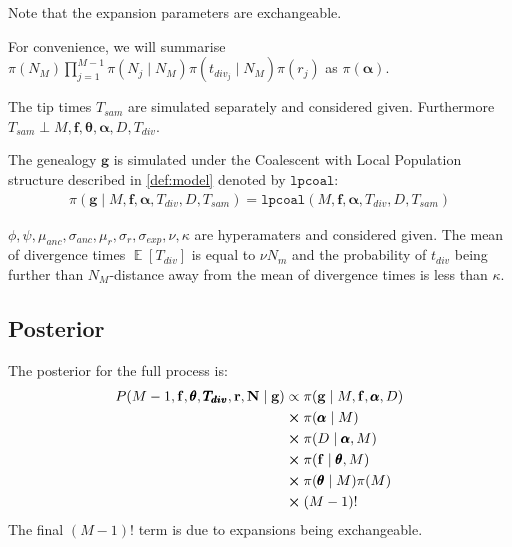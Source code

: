 \documentclass{report}
\theoremstyle{definition}
\begin{document}
Note that the expansion parameters are exchangeable.

For convenience, we will summarise $\pi(N_M)\prod\limits_{j=1}^{M-1}\pi(N_j\mid N_{M})\pi(t_{div_j}\mid N_{M})\pi(r_j)$ as $\pi(\pmb\alpha)$.

The tip times $T_{sam}$ are simulated separately and considered given. Furthermore $T_{sam} \perp M, \mathbf{f}, \pmb{\theta}, \pmb\alpha, D, T_{div}$.

The genealogy $\mathbf{g}$ is simulated under the Coalescent with Local Population structure described in \ref{def:model} denoted by $\texttt{lpcoal}$:
\begin{gather}
\pi(\mathbf{g}\mid M, \mathbf{f}, \pmb\alpha, T_{div}, D, T_{sam}) = \texttt{lpcoal}(M, \mathbf{f}, \pmb\alpha, T_{div}, D, T_{sam})
\end{gather} 

$\phi, \psi, \mu_{anc}, \sigma_{anc}, \mu_r, \sigma_r, \sigma_{exp}, \nu, \kappa$ are hyperamaters and considered given. The mean of divergence times $\mathop{\mathbb{E}}[T_{div}]$ is equal to $\nu N_m$ and the probability of $t_{div}$ being further than $N_M$-distance away from the mean of divergence times is less than $\kappa$.


\subsection{Posterior}
The posterior for the full process is:
\begin{gather}
\begin{aligned}
P(M-1, \mathbf{f}, \pmb{\theta}, \pmb{T_{div}}, \mathbf{r}, \mathbf{N}\mid\mathbf{g})
&\propto \pi(\mathbf{g}\mid M, \mathbf{f}, \pmb\alpha, D)\\
&\cross \pi(\pmb\alpha\mid M)\\
&\cross \pi(D\mid \pmb\alpha,M)\\
&\cross \pi(\mathbf{f}\mid\pmb{\theta}, M)\\
&\cross\pi(\pmb{\theta}\mid M)\pi(M)\\
&\cross (M-1)!
\end{aligned}
\end{gather}
The final $(M-1)!$ term is due to expansions being exchangeable.
\end{document}
